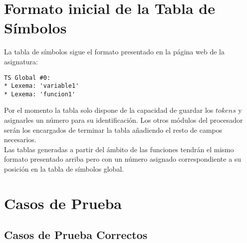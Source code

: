 \documentclass{article}
\begin{document}
\section{Formato inicial de la Tabla de Símbolos}
La tabla de símbolos sigue el formato presentado en la página web de la asignatura:
\begin{center}
\begin{verbatim}
TS Global #0:
* Lexema: 'variable1'
* Lexema: 'funcion1'
\end{verbatim}
\end{center}
Por el momento la tabla solo dispone de la capacidad de guardar los $tokens$ y asignarles un número para su identificación. Los otros módulos del procesador serán los encargados de terminar la tabla añadiendo el resto de campos\\ necesarios. \\
Las tablas generadas a partir del ámbito de las funciones tendrán el mismo formato presentado arriba pero con un número asignado correspondiente a su posición en la tabla de símbolos global.
\clearpage
\section{Casos de Prueba}


\subsection{Casos de Prueba Correctos}
\end{document}
